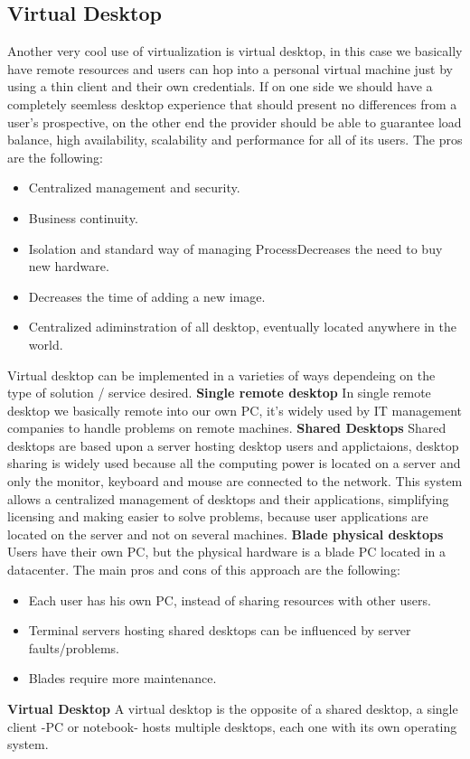\subsection{Virtual Desktop}
Another very cool use of virtualization is virtual desktop, in this case we basically have remote resources and users can hop into a personal virtual machine just by using a thin client and their own credentials. If on one side we should have a completely seemless desktop experience that should present no differences from a user's prospective, on the other end the provider should be able to guarantee load balance, high availability, scalability and performance for all of its users. \n
The pros are the following:
\begin{itemize}
    \item Centralized management and security.
    \item Business continuity.
    \item Isolation and standard way of managing ProcessDecreases the need to buy new hardware.
    \item Decreases the time of adding a new image.
    \item Centralized adiminstration of all desktop, eventually located anywhere in the world.
\end{itemize}
Virtual desktop can be implemented in a varieties of ways dependeing on the type of solution / service desired. \n
\textbf{Single remote desktop} \n
In single remote desktop we basically remote into our own PC, it's widely used by IT management companies to handle problems on remote machines. \n
\miniSpace
\textbf{Shared Desktops} \n
Shared desktops are based upon a server hosting desktop users and applictaions, desktop sharing is widely used because all the computing power is located on a server and only the monitor, keyboard and mouse are connected to the network. \n
This system allows a centralized management of desktops and their applications, simplifying licensing and making easier to solve problems, because user applications are located on the server and not on several machines. \n
\miniSpace
\textbf{Blade physical desktops}
Users have their own PC, but the physical hardware is a blade PC located in a datacenter. The main pros and cons of this approach are the following:
\begin{itemize}
    \item Each user has his own PC, instead of sharing resources with other users.
    \item Terminal servers hosting shared desktops can be influenced by server faults/problems.
    \item Blades require more maintenance.
\end{itemize}
\textbf{Virtual Desktop} \n
A virtual desktop is the opposite of a shared desktop, a single client -PC or notebook- hosts multiple desktops, each one with its own operating system.
